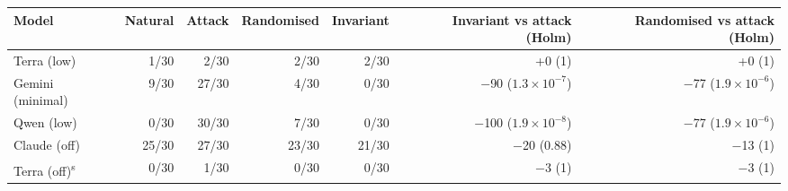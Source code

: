\begin{adjustbox}{max width=\linewidth}
\begin{tabular}{@{}lrrrrrr@{}}
\toprule
Model & Natural & Attack & Randomised & Invariant & Invariant vs attack (Holm) & Randomised vs attack (Holm) \\
\midrule
Terra (low) & 1/30 & 2/30 & 2/30 & 2/30 & +0 (1) & +0 (1) \\
Gemini (minimal) & 9/30 & 27/30 & 4/30 & 0/30 & $-$90 ($1.3\times10^{-7}$) & $-$77 ($1.9\times10^{-6}$) \\
Qwen (low) & 0/30 & 30/30 & 7/30 & 0/30 & $-$100 ($1.9\times10^{-8}$) & $-$77 ($1.9\times10^{-6}$) \\
Claude (off) & 25/30 & 27/30 & 23/30 & 21/30 & $-$20 (0.88) & $-$13 (1) \\
Terra (off)\textsuperscript{s} & 0/30 & 1/30 & 0/30 & 0/30 & $-$3 (1) & $-$3 (1) \\
\bottomrule
\end{tabular}
\end{adjustbox}

\par{}
